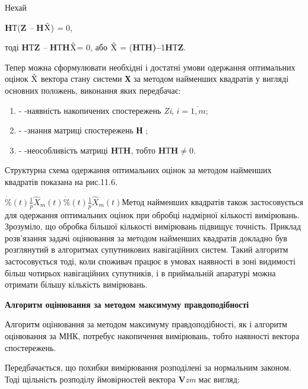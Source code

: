 Нехай 

\textbf{H}Т(\textbf{Z}\textit{ -- }\textbf{H}\textit{$\hat{{\rm X} }$}) \textit{= }0,

тоді  \textbf{H}Т\textbf{Z}\textit{ -- }\textbf{H}Т\textbf{H}\textit{$\hat{{
\rm X} }$}= 0,  або  \textit{$\hat{{\rm X} }$} = (\textbf{H}Т\textbf{H)--}1\textbf{H}Т\textbf{Z}.

Тепер 
можна сформулювати необхідні і достатні умови одержання оптимальних оцінок \textit{$\hat{{
\rm X} }$} вектора стану системи \textbf{Х} за методом найменших квадратів  у вигляді 
основних положень, виконання яких передбачає:

\begin{enumerate}
\item - -наявність накопичених спостережень \textit{Zi},\textit{ }$i=\overline{1,m}$;

\item - -знання 
матриці спостережень \textbf{Н} ;

\item - -неособливість матриці \textbf{H}Т\textbf{H}, тобто \textbar \textbf{H}Т\textbf{H}\textbar  $\ne $0.
\end{enumerate}

Структурна 
схема одержання оптимальних оцінок за методом найменших квадратів показана на рис.11.6.    

$\dot{
\% }(t)$$ $$ $$\frac{1}{p} $$\hat{X}_{m} (t)$$\dot{\% }(t)$$ $$ $$\frac{1}{p} $$\hat{X}_{m} 
(t)$Метод найменших квадратів також застосовується для одержання оптимальних оцінок 
при обробці надмірної кількості вимірювань. Зрозуміло, що обробка більшої кількості 
вимірювань підвищує точність. Приклад розв'язання задачі оцінювання за методом найменших 
квадратів докладно був розглянутий в алгоритмах супутникових навігаційних систем. 
Такий алгоритм застосовується  тоді, коли споживач працює в умовах наявності в зоні 
видимості більш чотирьох навігаційних супутників, і в приймальній апаратурі можна 
отримати більшу кількість вимірювань.

\textbf{Алгоритм оцінювання за методом максимуму правдоподібності} 

Алгоритм оцінювання за методом максимуму правдоподібності,  як і алгоритм оцінювання 
за МНК, потребує накопичення вимірювань, тобто наявності вектора спостережень. 

Передбачається, що похибки вимірювання розподілені за нормальним законом. Тоді щільність 
розподілу ймовірностей вектора  \textbf{V}\textit{zm} має вигляд:

